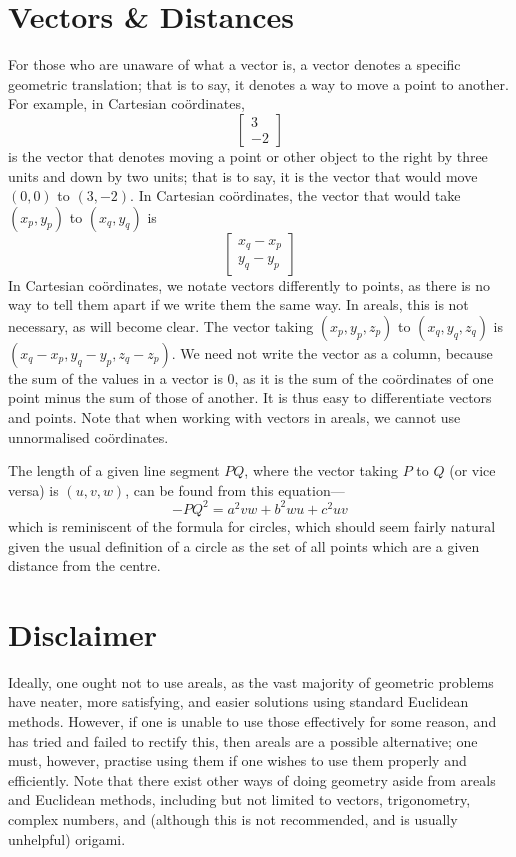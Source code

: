 \section{Vectors \& Distances}
\begin{multicols}{2}
For those who are unaware of what a vector is, a vector denotes a specific geometric translation; that is to say, it denotes a way to move a point to another. For example, in Cartesian co\"ordinates, \[\begin{bmatrix}3\\-2\end{bmatrix}\] is the vector that denotes moving a point or other object to the right by three units and down by two units; that is to say, it is the vector that would move \((0,0)\) to \((3,-2)\). In Cartesian co\"ordinates, the vector that would take \((x_p,y_p)\) to \((x_q,y_q)\) is  \[\begin{bmatrix}x_q-x_p\\y_q-y_p\end{bmatrix}\]
\textsl{}
In Cartesian co\"ordinates, we notate vectors differently to points, as there is no way to tell them apart if we write them the same way. In areals, this is not necessary, as will become clear. The vector taking \((x_p,y_p,z_p)\) to \((x_q,y_q,z_q)\) is \((x_q-x_p,y_q-y_p,z_q-z_p)\). We need not write the vector as a column, because the sum of the values in a vector is 0, as it is the sum of the co\"ordinates of one point minus the sum of those of another. It is thus easy to differentiate vectors and points. Note that when working with vectors in areals, we cannot use unnormalised co\"ordinates.

The length of a given line segment \(PQ\), where the vector taking \(P\) to \(Q\) (or vice versa) is \((u,v,w)\), can be found from this equation--- \[-PQ^2=a^2vw+b^2wu+c^2uv\]
which is reminiscent of the formula for circles, which should seem fairly natural given the usual definition of a circle as the set of all points which are a given distance from the centre.
\end{multicols}
\section{Disclaimer}
\begin{multicols}{2}
Ideally, one ought not to use areals, as the vast majority of geometric problems have neater, more satisfying, and easier solutions using standard Euclidean methods. However, if one is unable to use those effectively for some reason, and has tried and failed to rectify this, then areals are a possible alternative; one must, however, practise using them if one wishes to use them properly and efficiently. Note that there exist other ways of doing geometry aside from areals and Euclidean methods, including but not limited to vectors, trigonometry, complex numbers, and (although this is not recommended, and is usually unhelpful) origami.
\end{multicols}